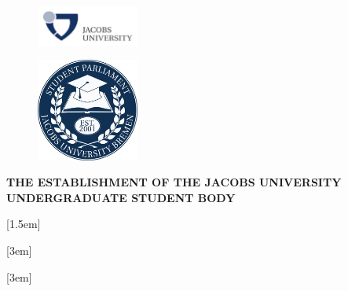 \documentclass[12pt]{../misc/constitution}
\begin{document}


\begin{figure}[H]
    \centering
    \includegraphics[width=0.3\textwidth, right]{../misc/jacobs.png}
\end{figure}

\begin{figure}[H]
    \centering
    \includegraphics[width=0.3\textwidth]{../misc/usg.jpg}
\end{figure}

\begin{center}
\textbf{\Large{THE ESTABLISHMENT OF THE JACOBS UNIVERSITY\\
UNDERGRADUATE STUDENT BODY}}
\end{center}

\begingroup
\let\clearpage\relax
\setcounter{tocdepth}{3}

\makeatletter
\def\toclevel@part{0}
\def\toclevel@article{1}
[1.5em] {\bfseries} {\contentslabel{2.8em}} {\hspace*{-2.3em}} {\contentspage}
\def\toclevel@section{2}
[3em] {\normalfont} {\contentslabel{2.3em}} {\hspace*{-2.3em}} {\contentspage}
\def\toclevel@sectionstar{2}
[3em] {\normalfont} {\contentslabel{2.3em}} {\hspace*{-2.3em}} {\contentspage}
\makeatother

\renewcommand{\contentsname}{\centering Table of Contents}
\end{document}

